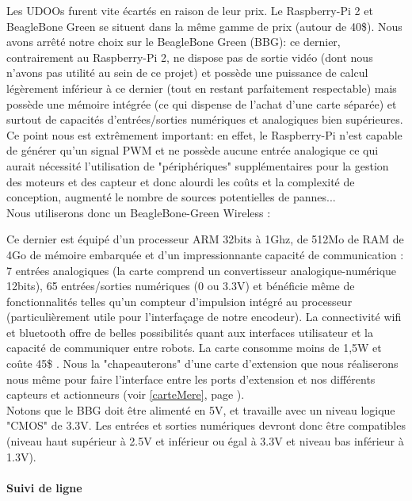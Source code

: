 			Les UDOOs furent vite écartés en raison de leur prix.
			Le Raspberry-Pi 2 et BeagleBone Green se situent dans la même gamme de prix (autour de 40\$). Nous avons arrêté notre choix sur le BeagleBone Green (BBG): ce dernier, contrairement au Raspberry-Pi 2, ne dispose pas de sortie vidéo (dont nous n'avons pas utilité au sein de ce projet) et possède une puissance de calcul légèrement inférieur à ce dernier (tout en restant parfaitement respectable) mais possède une mémoire intégrée (ce qui dispense de l'achat d'une carte séparée) et surtout de capacités d'entrées/sorties numériques et analogiques bien supérieures. Ce point nous est extrêmement important: en effet, le Raspberry-Pi n'est capable de générer qu'un signal PWM et ne possède aucune entrée analogique ce qui aurait nécessité l'utilisation de "périphériques" supplémentaires pour la gestion des moteurs et des capteur et donc alourdi les coûts et la complexité de conception, augmenté le nombre de sources potentielles de pannes...\\

			Nous utiliserons donc un BeagleBone-Green Wireless :

			Ce dernier est équipé d'un processeur ARM 32bits à 1Ghz, de 512Mo de RAM de 4Go de mémoire embarquée et d'un impressionnante capacité de communication : 7 entrées analogiques (la carte comprend un convertisseur analogique-numérique 12bits), 65 entrées/sorties numériques (0 ou 3.3V) et bénéficie même de fonctionnalités telles qu'un compteur d'impulsion intégré au processeur (particulièrement utile pour l'interfaçage de notre encodeur). La connectivité wifi et bluetooth offre de belles possibilités quant aux interfaces utilisateur et la capacité de communiquer entre robots. La carte consomme moins de 1,5W et coûte 45\$ \cite{bib6}.
			Nous la "chapeauterons" d'une carte d'extension que nous réaliserons nous même pour faire l'interface entre les ports d'extension et nos différents capteurs et actionneurs (voir \ref{carteMere}, page \pageref{carteMere}).\\

			Notons que le BBG doit être alimenté en 5V, et travaille avec un niveau logique "CMOS" de 3.3V. Les entrées et sorties numériques devront donc être compatibles (niveau haut supérieur à 2.5V et inférieur ou égal à 3.3V et niveau bas inférieur à 1.3V).

		\paragraph{Suivi de ligne}\label{solutionSuiviLigne}

